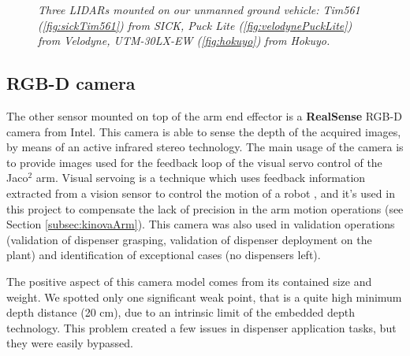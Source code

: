 \begin{figure}
	\centering
	\caption{\textit{Three \ac{LIDAR}s mounted on our unmanned ground vehicle: Tim561 (\ref{fig:sickTim561}) from SICK, Puck Lite (\ref{fig:velodynePuckLite}) from Velodyne, UTM-30LX-EW (\ref{fig:hokuyo}) from Hokuyo.}}
\end{figure}

\subsection{RGB-D camera}
The other sensor mounted on top of the arm end effector is a \textbf{RealSense} RGB-D camera from Intel. This camera is able to sense the depth of the acquired images, by means of an active infrared stereo technology. The main usage of the camera is to provide images used for the feedback loop of the visual servo control of the Jaco$^2$ arm. Visual servoing is a technique which uses feedback information extracted from a vision sensor to control the motion of a robot \parencite{visualServo}, and it's used in this project to compensate the lack of precision in the arm motion operations (see Section \ref{subsec:kinovaArm}). This camera was also used in validation operations (validation of dispenser grasping, validation of dispenser deployment on the plant) and identification of exceptional cases (no dispensers left). 
\par The positive aspect of this camera model comes from its contained size and weight. We spotted only one significant weak point, that is a quite high minimum depth distance (20 cm), due to an intrinsic limit of the embedded depth technology. This problem created a few issues in dispenser application tasks, but they were easily bypassed.

